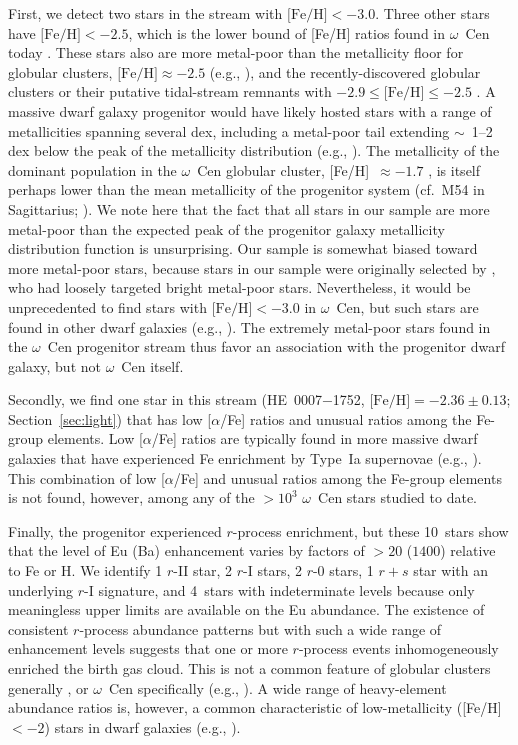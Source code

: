\documentclass[twocolumn]{aastex63}
\begin{document}
First, we detect two stars in the stream with $\mbox{[Fe/H]}<-3.0$. 
Three other stars have $\mbox{[Fe/H]} < -2.5$, which is the lower bound of [Fe/H] ratios found in $\omega$~Cen today \citep{johnson20}.
These stars also are more metal-poor than the metallicity floor for globular clusters, $\mbox{[Fe/H]} \approx -2.5$ (e.g., \citealt{beasley19}), and the recently-discovered globular clusters or their putative tidal-stream remnants with
$-2.9 \leq \mbox{[Fe/H]} \leq -2.5$ \citep{roederer2019,larsen20,wan20}.
A massive dwarf galaxy progenitor would have likely hosted stars with a range of metallicities spanning several dex, including a metal-poor tail extending $\sim$~1--2\,dex below the peak of the metallicity distribution (e.g., \citealt{kirby11b}).
The metallicity of the dominant population in the $\omega$~Cen globular cluster,
\mbox{[Fe/H]}~$\approx -1.7$ \citep{Johnson10}, is itself perhaps lower than the mean metallicity of the progenitor system (cf.\ M54 in Sagittarius; \citealt{carretta10m54,hyde15}). We note here 
that the fact that all stars in our sample are more metal-poor than the expected peak of the progenitor galaxy metallicity distribution function is unsurprising. Our sample is somewhat biased toward more metal-poor stars, because stars in our sample were originally selected by \citet{Frebel06b}, who had loosely targeted bright metal-poor stars.
Nevertheless, it would be unprecedented to find stars with $\mbox{[Fe/H]} < -3.0$ in $\omega$~Cen, but such stars are found in other dwarf galaxies (e.g., \citealt{frebel10a}).
The extremely metal-poor stars found in the $\omega$~Cen progenitor stream thus favor an association with the progenitor dwarf galaxy, but not $\omega$~Cen itself.

Secondly, we find one star in this stream (\mbox{HE~0007$-$1752},
$\mbox{[Fe/H]} = -2.36 \pm 0.13$; Section~\ref{sec:light}) that has low [$\alpha$/Fe] ratios and unusual ratios among the Fe-group elements. 
Low [$\alpha$/Fe] ratios are typically found in more massive dwarf galaxies that have experienced Fe enrichment by Type~Ia supernovae (e.g., \citealt{Tolstoy04,Venn12}). 
This combination of low [$\alpha$/Fe] and unusual ratios among the Fe-group elements is not found, however, among any of the $> 10^{3}$ $\omega$~Cen stars studied to date.

Finally, the progenitor experienced $r$-process enrichment, but these 10~stars show that the level of Eu (Ba) enhancement varies by factors of $> 20$ ($1400$) relative to Fe or H.
We identify 1 $r$-II star, 2 $r$-I stars, 2 $r$-0 stars, 1 $r+s$ star with an underlying $r$-I signature, and 4~stars with indeterminate levels because only meaningless upper limits are available on the Eu abundance.
The existence of consistent $r$-process abundance patterns but with such a wide range of enhancement levels suggests that one or more $r$-process events inhomogeneously enriched the birth gas cloud.
This is not a common feature of globular clusters generally \citep{roederer11a}, or $\omega$~Cen specifically (e.g., \citealt{Johnson10}).
A wide range of heavy-element abundance ratios is, however, a common characteristic of low-metallicity (\mbox{[Fe/H]}~$< -2$) stars in dwarf galaxies (e.g., \citealt{cohen10,Tsujimoto15a}).
\end{document}

